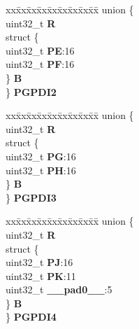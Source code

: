\begin{DoxyCompactItemize}
\begin{tabbing}
\end{tabbing}\item 
\mbox{\label{structSIU__tag_a469d93195743bfa00bd2bb06152dc502}} 
\begin{tabbing}
xx\=xx\=xx\=xx\=xx\=xx\=xx\=xx\=xx\=\kill
union \{\\
\>uint32\_t {\bfseries R}\\
\>struct \{\\
\>\>uint32\_t {\bfseries PE}:16\\
\>\>uint32\_t {\bfseries PF}:16\\
\>\} {\bfseries B}\\
\} {\bfseries PGPDI2}\\

\end{tabbing}\item 
\mbox{\label{structSIU__tag_a12b286887fc204b4d2324961a3d1a80f}} 
\begin{tabbing}
xx\=xx\=xx\=xx\=xx\=xx\=xx\=xx\=xx\=\kill
union \{\\
\>uint32\_t {\bfseries R}\\
\>struct \{\\
\>\>uint32\_t {\bfseries PG}:16\\
\>\>uint32\_t {\bfseries PH}:16\\
\>\} {\bfseries B}\\
\} {\bfseries PGPDI3}\\

\end{tabbing}\item 
\mbox{\label{structSIU__tag_a461eb89c29a3b6304c5a0969095ef780}} 
\begin{tabbing}
xx\=xx\=xx\=xx\=xx\=xx\=xx\=xx\=xx\=\kill
union \{\\
\>uint32\_t {\bfseries R}\\
\>struct \{\\
\>\>uint32\_t {\bfseries PJ}:16\\
\>\>uint32\_t {\bfseries PK}:11\\
\>\>uint32\_t {\bfseries \_\_pad0\_\_}:5\\
\>\} {\bfseries B}\\
\} {\bfseries PGPDI4}\\


\end{tabbing}
\end{DoxyCompactItemize}
